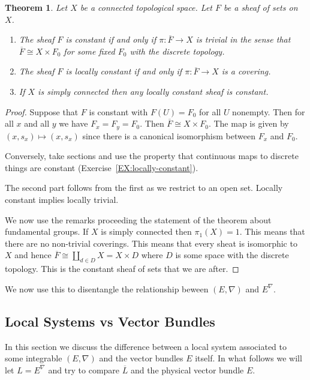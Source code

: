 \documentclass[12pt]{book}
\numberwithin{equation}{section}
\newtheorem{theorem}{Theorem}[subsection]
\theoremstyle{definition}
\theoremstyle{remark}
\begin{document}
\begin{theorem}
	Let $X$ be a connected topological space. 
	Let $F$ be a sheaf of sets on $X$.
	\begin{enumerate}
		\item The sheaf $F$ is constant if and only if $\pi:\overline{F}\to X$ is trivial in the sense that $\overline{F} \cong X\times F_0$ for some fixed $F_0$ with the discrete topology. 
		\item The sheaf $F$ is locally constant if and only if $\pi: \overline{F} \to X$ is a covering. 
		\item If $X$ is simply connected then any locally constant sheaf is constant.
	\end{enumerate}
\end{theorem}
\begin{proof}
	Suppose that $F$ is constant with $F(U)=F_0$ for all $U$ nonempty.
	Then for all $x$ and all $y$ we have $F_x=F_y=F_0$.
	Then $\overline{F} \cong X \times F_0$. 
	The map is given by $(x,s_x) \mapsto (x,s_x)$ since there is a canonical isomorphism between $F_x$ and $F_0$.
	
	Conversely, take sections and use the property that continuous maps to discrete things are constant (Exercise~\ref{EX:locally-constant}).
	
	The second part follows from the first as we restrict to an open set. 
	Locally constant implies locally trivial. 
	
	We now use the remarks proceeding the statement of the theorem about fundamental groups. 
	If $X$ is simply connected then $\pi_1(X)=1$. 
	This means that there are no non-trivial coverings. 
	This means that every sheat is isomorphic to $X$ and hence $\overline{F} \cong \coprod_{d\in D} X=X\times D$ where $D$ is some space with the discrete topology. 
	This is the constant sheaf of sets that we are after.
\end{proof}

We now use this to disentangle the relationship beween $(E,\nabla)$ and $E^{\nabla}$.

\subsection{Local Systems vs Vector Bundles}
In this section we discuss the difference between a local system associated to some integrable $(E,\nabla)$ and the vector bundles $E$ itself.
In what follows we will let $L = E^{\nabla}$ and try to compare $\overline{L}$ and the physical vector bundle $E$.
\end{document}
